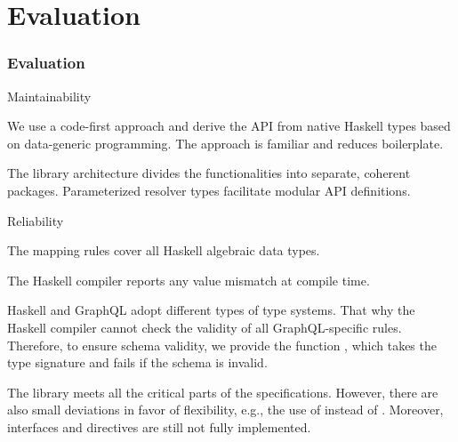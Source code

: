 \section{Evaluation}

\begin{frame}[allowframebreaks]\frametitle{Evaluation}

\begin{block}{Maintainability}

  \begin{itemize}
  
     We use a code-first approach and derive the API from native Haskell types based on data-generic programming. The approach is familiar and reduces boilerplate.

    The library architecture divides the functionalities into separate, coherent packages. Parameterized resolver types facilitate modular API definitions.

  \end{itemize}

\end{block}


\begin{block}{Reliability}

\begin{itemize}

    \begin{enumerate}

       The mapping rules cover all Haskell algebraic data types.

       The Haskell compiler reports any value mismatch at compile time.
      
       Haskell and GraphQL adopt different types of type systems. That why the Haskell compiler cannot check the validity of all GraphQL-specific rules. Therefore, to ensure schema validity, we provide the function , which takes the  type signature and fails if the schema is invalid.
    
    \end{enumerate}

   The library meets all the critical parts of the specifications. However, there are also small deviations in favor of flexibility, e.g., the use of  instead of . Moreover, interfaces and directives are still not fully implemented. 


\end{itemize}
\end{block}
\end{frame}
